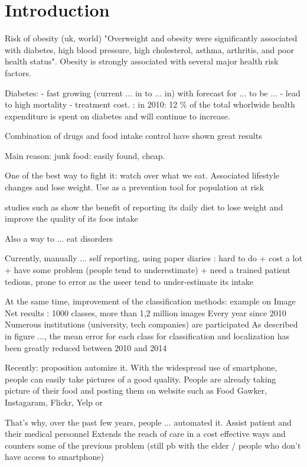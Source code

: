 \chapter{Introduction}

Risk of obesity \cite{Mokdad2003} (uk, world) "Overweight and obesity were significantly associated with diabetes, high blood pressure, high cholesterol, asthma, arthritis, and poor health status". Obesity is strongly associated with several major health risk factors.

Diabetes:
- fast growing (current ... in to ... in) with forecast for ... to be ...
- lead to high mortality
- treatment cost. \cite{Zhang2010}: in 2010: 12 \% of the total whorlwide health expenditure is spent on diabetes and will continue to increase.

Combination of drugs and food intake control have shown great results

Main reason: junk food: easily found, cheap.

One of the best way to fight it: watch over what we eat. Associated lifestyle changes and lose weight. Use as a prevention tool for population at risk

studies such as \cite{Burke2011a} show the benefit of reporting its daily diet to lose weight and improve the quality of its foos intake

Also a way to ... eat disorders

Currently, manually ... self reporting, using paper diaries : hard to do + cost a lot + have some problem (people tend to underestimate) + need a trained patient
tedious, prone to error as the useer tend to under-estimate its intake

At the same time, improvement of the classification methods: example on Image Net results \cite{Russakovsky2015}:
1000 classes, more than 1,2 million images
Every year since 2010
Numerous institutions (university, tech companies) are participated
As described in figure ..., the mean error for each class for classification and localization has been greatly reduced between 2010 and 2014

Recently: proposition automize it. With the widespread use of smartphone, people can easily take pictures of a good quality. People are already taking picture of their food and posting them on website such as Food Gawker, Instagaram, Flickr, Yelp or 

That's why, over the past few years, people ... automated it. Assist patient and their medical personnel
Extends the reach of care in a cost effective ways and counters some of the previous problem (still pb with the elder / people who don't have access to smartphone)

